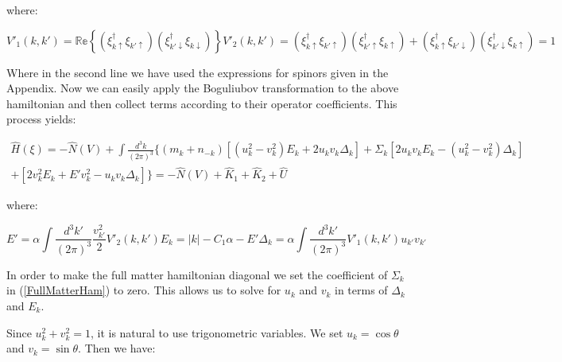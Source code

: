 \begin{doublespace}
where:

\begin{subequations}
\begin{equation}
    V'_1(k,k') = \mathbb{Re}\left\{(\xi^\dag_{k\uparrow}\xi_{k'\uparrow})(\xi^\dag_{k'\downarrow}\xi_{k\downarrow}) \right\}
\end{equation}
\begin{equation}
    V'_2(k,k') = (\xi^\dag_{k\uparrow}\xi_{k'\uparrow})(\xi^\dag_{k'\uparrow}\xi_{k\uparrow}) +
            (\xi^\dag_{k\uparrow}\xi_{k'\downarrow})(\xi^\dag_{k'\downarrow}\xi_{k\uparrow}) = 1
\end{equation}
\end{subequations}

Where in the second line we have used the expressions for spinors given in the Appendix. Now we can
easily apply the Boguliubov transformation to the above hamiltonian and then collect terms
according to their operator coefficients. This process yields:

\begin{multline}\label{FullMatterHam}
    \hat H(\xi) = -\hat N(V) +  \int\frac{d^3k}{(2\pi)^3} \bigg\{ (m_k + n_{-k})\left[ (u^2_k - v^2_k)E_k + 2u_k v_k \Delta_k
    \right] + \Sigma_k \left[ 2u_k v_k E_k - (u^2_k - v^2_k)\Delta_k \right] \\
    + \left[ 2v^2_k E_k + E'v^2_k - u_k v_k \Delta_k \right] \bigg\}
     = -\hat N(V) + \hat K_1 + \hat K_2 + \hat U
\end{multline}

where:

\begin{subequations}\label{Defs}
\begin{equation}
    E' = \alpha \int \frac{d^3k'}{(2\pi)^3} \frac{v_{k'}^2}{2} V'_2(k,k')
\end{equation}
\begin{equation}
    E_k =  |k| - C_1\alpha - E'
\end{equation}
\begin{equation}
    \Delta_k = \alpha \int \frac{d^3k'}{(2\pi)^3} V'_1(k,k') u_{k'} v_{k'}
\end{equation}
\end{subequations}

In order to make the full matter hamiltonian diagonal we set the coefficient of $\Sigma_k$ in
(\ref{FullMatterHam}) to zero. This allows us to solve for $u_k$ and $v_k$ in terms of $\Delta_k$
and $E_k$.

Since $u_k^2 + v_k^2=1$, it is natural to use trigonometric variables. We set $u_k = \cos\theta$
and $v_k = \sin\theta$. Then we have:


\end{doublespace}
